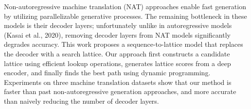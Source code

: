 Non-autoregressive machine translation (NAT) approaches enable fast generation by utilizing parallelizable generative processes. The remaining bottleneck in these models is their decoder layers; unfortunately unlike in autoregressive models (Kasai et al.,  2020), removing decoder layers from NAT models significantly degrades accuracy. This work proposes a sequence-to-lattice model that replaces the decoder with a search lattice.  Our approach first constructs a candidate lattice using efficient lookup operations, generates lattice scores from a deep encoder, and finally finds the best path using dynamic programming. Experiments on three machine translation datasets show that our method is faster than past non-autoregressive generation approaches, and more accurate than naively reducing the number of decoder layers.

